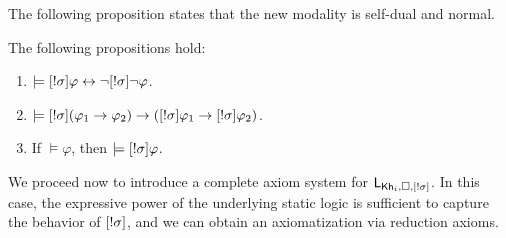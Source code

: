 \medskip

The following proposition states that the new modality is self-dual and normal.

\medskip 

\begin{proposition}
The following propositions hold:
\begin{enumerate}
\item $\models [!\sigma]\varphi \leftrightarrow \neg[!\sigma]\neg\varphi$. 
\item $\models [!\sigma](\varphi_1 \rightarrow \varphi_2) \rightarrow ([!\sigma]\varphi_1 \rightarrow [!\sigma]\varphi_2)$.
\item If $\models \varphi$, then $\models [!\sigma]\varphi$.
\end{enumerate}
\end{proposition}

\medskip 


We proceed now to introduce a complete axiom system for $\mathsf{L}_{{\sf Kh}_i,\square,[!\sigma]}$. In this case, the expressive power of the underlying static logic is sufficient to capture the behavior of $[!\sigma]$, and we can obtain an axiomatization via reduction axioms.

